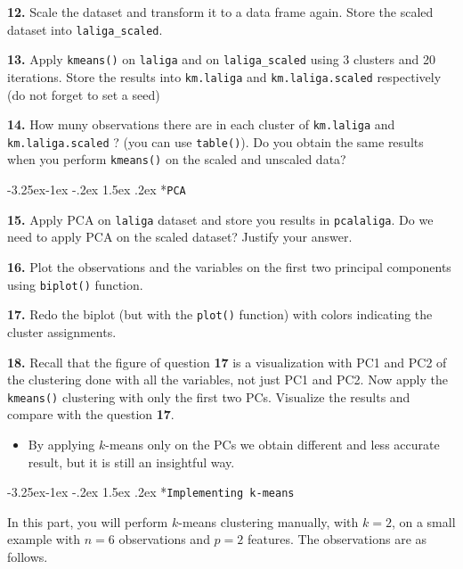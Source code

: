 \documentclass[]{book}
\makeatletter
\newenvironment{rmdblock}[1]
  {\begin{shaded*}
  \begin{itemize}
  \renewcommand{\labelitemi}{
    \raisebox{-.7\height}[0pt][0pt]{
      {\setkeys{Gin}{width=2em,keepaspectratio}\texttt{[image: img/icons/\#1]}}
    }
  }
  \item
  }
  {
  \end{itemize}
  \end{shaded*}
  }
\newenvironment{rmdinsight}
  {\begin{rmdblock}{insight}}
  {\end{rmdblock}}
\renewcommand\subsection{\@startsection{subsection}{2}{\z@}%
                                     {-3.25ex\@plus -1ex \@minus -.2ex}%
                                     {1.5ex \@plus .2ex}%
                                     {\normalfont\large\bfseries\color{Violet}}}
\theoremstyle{definition}
\theoremstyle{definition}
\theoremstyle{definition}
\theoremstyle{remark}
\makeatother
\begin{document}
\textbf{12.} Scale the dataset and transform it to a data frame again.
Store the scaled dataset into \texttt{laliga\_scaled}.

\textbf{13.} Apply \texttt{kmeans()} on \texttt{laliga} and on
\texttt{laliga\_scaled} using 3 clusters and 20 iterations. Store the
results into \texttt{km.laliga} and \texttt{km.laliga.scaled}
respectively (do not forget to set a seed)

\textbf{14.} How muny observations there are in each cluster of
\texttt{km.laliga} and \texttt{km.laliga.scaled} ? (you can use
\texttt{table()}). Do you obtain the same results when you perform
\texttt{kmeans()} on the scaled and unscaled data?

\subsection*{\texorpdfstring{\texttt{PCA}}{PCA}}\label{pca}

\textbf{15.} Apply PCA on \texttt{laliga} dataset and store you results
in \texttt{pcalaliga}. Do we need to apply PCA on the scaled dataset?
Justify your answer.

\textbf{16.} Plot the observations and the variables on the first two
principal components using \texttt{biplot()} function.

\textbf{17.} Redo the biplot (but with the \texttt{plot()} function)
with colors indicating the cluster assignments.

\textbf{18.} Recall that the figure of question \textbf{17} is a
visualization with PC1 and PC2 of the clustering done with all the
variables, not just PC1 and PC2. Now apply the \texttt{kmeans()}
clustering with only the first two PCs. Visualize the results and
compare with the question \textbf{17}.

\begin{rmdinsight}
By applying \(k\)-means only on the PCs we obtain different and less
accurate result, but it is still an insightful way.
\end{rmdinsight}

\subsection*{\texorpdfstring{\texttt{Implementing\ k-means}}{Implementing k-means}}\label{implementing-k-means}

In this part, you will perform \(k\)-means clustering manually, with
\(k=2\), on a small example with \(n=6\) observations and \(p=2\)
features. The observations are as follows.
\end{document}
